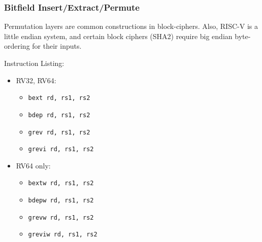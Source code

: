 \subsubsection{Bitfield Insert/Extract/Permute}
Permutation layers are common constructions in block-ciphers.
Also, RISC-V is a little endian system, and certain block ciphers (SHA2)
require big endian byte-ordering for their inputs.

Instruction Listing:
\begin{itemize}
\item RV32, RV64:
\begin{itemize}
\item {\tt bext   rd, rs1, rs2}
\item {\tt bdep   rd, rs1, rs2}
\item {\tt grev   rd, rs1, rs2}
\item {\tt grevi  rd, rs1, rs2}
\end{itemize}
\item RV64 only:
\begin{itemize}
\item {\tt bextw  rd, rs1, rs2}
\item {\tt bdepw  rd, rs1, rs2}
\item {\tt grevw  rd, rs1, rs2}
\item {\tt greviw rd, rs1, rs2}
\end{itemize}
\end{itemize}


